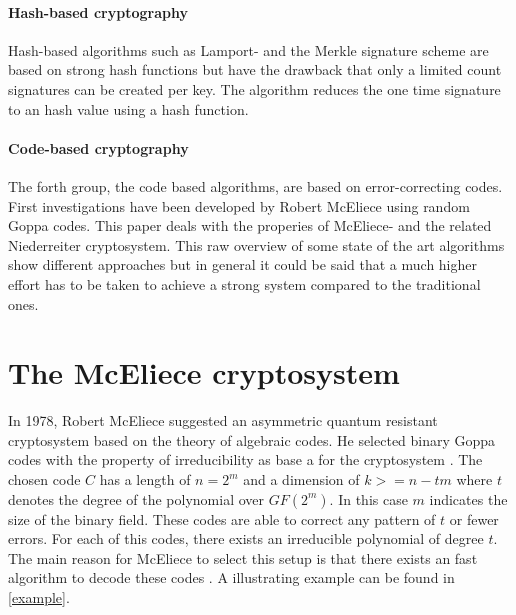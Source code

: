 \paragraph*{Hash-based cryptography}
Hash-based algorithms such as Lamport- \cite{wiki:lamportsig} and the Merkle \cite{wiki:merklesig} signature scheme are based on strong hash functions but have the drawback that only a limited count signatures can be created per key. The algorithm reduces the one time signature to an hash value using a hash function\cite{bernstein2009introduction}.

\paragraph*{Code-based cryptography}
The forth group, the code based algorithms, are based on error-correcting codes. First investigations have been developed by Robert McEliece using random Goppa codes\cite{wiki:bingoppa}. This paper deals with the properies of McEliece- and the related Niederreiter cryptosystem\cite{bernstein2009introduction}\cite{wiki:niederreither}.
\newline
\newline
This raw overview of some state of the art algorithms show different approaches but in general it could be said that a much higher effort has to be taken to achieve a strong system compared to the traditional ones. 

\section{The McEliece cryptosystem}
\label{mceliece}
In 1978, Robert McEliece suggested an asymmetric quantum resistant cryptosystem based on the theory of algebraic codes. He selected binary Goppa codes with the property of irreducibility as base a for the cryptosystem \cite{mceliece1978public}. The chosen code $C$ has a length of $n = 2^m$ and a dimension of $k >= n - tm$ where $t$ denotes the degree of the polynomial over $GF(2^m)$. In this case $m$ indicates the size of the binary field. These codes are able to correct any pattern of $t$ or fewer errors. 
For each of this codes, there exists an irreducible polynomial of degree $t$. 
The main reason for McEliece to select this setup is that there exists an fast algorithm to decode these codes \cite{mceliece2002theory}. A illustrating example can be found in \ref{example}.

